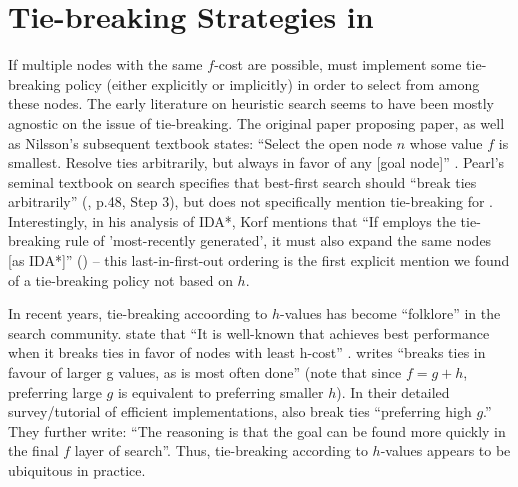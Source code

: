 \section{Tie-breaking Strategies in \astar}


If multiple nodes with the same $f$-cost are possible, \astar
must implement some tie-breaking policy (either
explicitly or implicitly) in order to select from among these nodes.
The early literature on heuristic search seems to have been mostly agnostic on the issue of tie-breaking.
The original paper proposing \astar paper, as well as Nilsson's
subsequent textbook states: ``Select the open node $n$ whose value $f$
is smallest. Resolve ties arbitrarily, but always in favor of any [goal
node]'' \cite[p.102 Step 2]{hart1968formal} \cite[p.69]{Nilsson71}.
Pearl's seminal textbook on search specifies that best-first search should ``break ties arbitrarily'' (\citeyear{pearl1984heuristics}, p.48, Step 3), but does not specifically mention tie-breaking for \astar.
Interestingly, in his analysis of IDA*, Korf mentions that ``If \astar employs the tie-breaking rule of 'most-recently generated', it must also expand the same nodes [as IDA*]'' (\citeyear{korf1985depth}) -- this last-in-first-out ordering is the first explicit mention we found of a tie-breaking policy not based on $h$.

In recent years, tie-breaking accoording to $h$-values has become ``folklore'' in the search community.
\citeauthor{hansen2007anytime} state that ``It is well-known 
that \astar achieves best performance when it breaks ties
in favor of nodes with least h-cost'' \cite{hansen2007anytime}.
\citeauthor{holte2010common} writes ``\astar breaks ties in favour
of larger g values, as is most often done'' (note that since $f=g+h$, preferring large $g$ is equivalent to preferring smaller $h$).
In their detailed survey/tutorial of efficient \astar implementations, \citeauthor{burns2012implementing} also break ties ``preferring high
$g$.'' They further write: ``The reasoning is that the goal can be found more quickly in the final $f$ layer of search''. 
Thus, tie-breaking according to $h$-values appears to be ubiquitous in practice.


